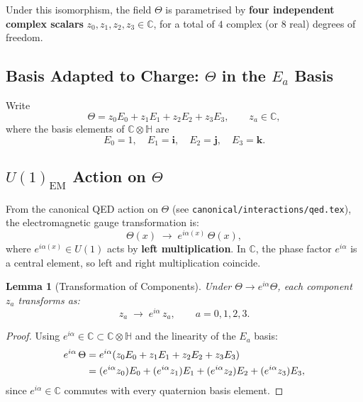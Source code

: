 \documentclass[11pt,a4paper]{article}
\newcommand{\C}{\mathbb{C}}
\renewcommand{\H}{\mathbb{H}}
\newtheorem{lemma}[theorem]{Lemma}
\theoremstyle{remark}
\begin{document}
Under this isomorphism, the field $\Theta$ is parametrised by \textbf{four independent complex
scalars} $z_0, z_1, z_2, z_3 \in \C$, for a total of $4$ complex (or $8$ real) degrees of
freedom.

\subsection{Basis Adapted to Charge: $\Theta$ in the $E_a$ Basis}

Write
\begin{equation}
  \Theta = z_0 E_0 + z_1 E_1 + z_2 E_2 + z_3 E_3, \qquad z_a \in \C,
  \label{eq:Theta_basis}
\end{equation}
where the basis elements of $\C \otimes \H$ are
\begin{equation}
  E_0 = 1, \quad E_1 = \mathbf{i}, \quad E_2 = \mathbf{j}, \quad E_3 = \mathbf{k}.
  \label{eq:basis_elements}
\end{equation}

\subsection{$U(1)_{\mathrm{EM}}$ Action on $\Theta$}

From the canonical QED action on $\Theta$ (see \texttt{canonical/interactions/qed.tex}),
the electromagnetic gauge transformation is:
\begin{equation}
  \Theta(x) \;\to\; e^{i\alpha(x)}\,\Theta(x),
  \label{eq:U1_action}
\end{equation}
where $e^{i\alpha(x)} \in U(1)$ acts by \textbf{left multiplication}. In $\C$, the phase factor
$e^{i\alpha}$ is a central element, so left and right multiplication coincide.

\begin{lemma}[Transformation of Components]
Under $\Theta \to e^{i\alpha}\Theta$, each component $z_a$ transforms as:
\begin{equation}
  z_a \;\to\; e^{i\alpha}\,z_a, \qquad a = 0,1,2,3.
  \label{eq:component_transform}
\end{equation}
\end{lemma}

\begin{proof}
Using $e^{i\alpha} \in \C \subset \C \otimes \H$ and the linearity of the $E_a$ basis:
\begin{align}
  e^{i\alpha}\,\Theta
  &= e^{i\alpha}(z_0 E_0 + z_1 E_1 + z_2 E_2 + z_3 E_3) \notag\\
  &= (e^{i\alpha} z_0) E_0 + (e^{i\alpha} z_1) E_1
   + (e^{i\alpha} z_2) E_2 + (e^{i\alpha} z_3) E_3,
\end{align}
since $e^{i\alpha} \in \C$ commutes with every quaternion basis element.
\end{proof}
\end{document}
